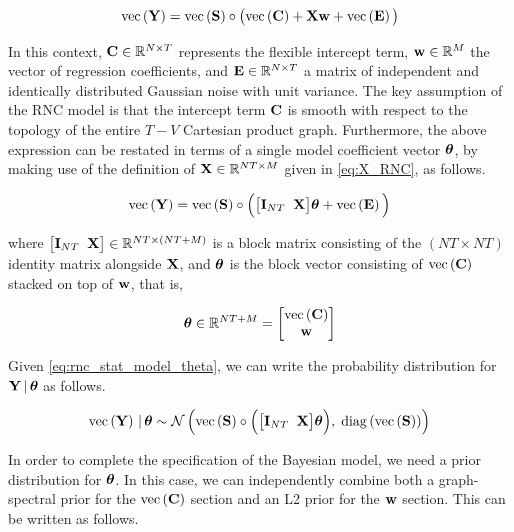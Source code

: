 \begin{equation}
    \label{eq:rnc_stat_model_wc}
    \text{\textup{vec}}\left(\mathbf{Y}\right) = \text{\textup{vec}}\left(\mathbf{S}\right) \circ \big( \text{\textup{vec}}\left(\mathbf{C}\right) + \mathbf{X} \mathbf{w}  + \text{\textup{vec}}\left(\mathbf{E}\right) \big)
\end{equation}

In this context, $\mathbf{C} \in \mathbb{R}^{N \times T}$ represents the flexible intercept term, $\mathbf{w} \in \mathbb{R}^{M}$ the vector of regression coefficients, and $\mathbf{E} \in \mathbb{R}^{N \times T}$ a matrix of independent and identically distributed Gaussian noise with unit variance. The key assumption of the RNC model is that the intercept term $\mathbf{C}$ is smooth with respect to the topology of the entire $T-V$ Cartesian product graph. Furthermore, the above expression can be restated in terms of a single model coefficient vector $\boldsymbol{\theta}$, by making use of the definition of $\mathbf{X} \in \mathbb{R}^{NT \times M}$ given in \cref{eq:X_RNC}, as follows.

\begin{equation}
    \label{eq:rnc_stat_model_theta}
    \text{\textup{vec}}\left(\mathbf{Y}\right) = \text{\textup{vec}}\left(\mathbf{S}\right) \circ \Big( \big[ \mathbf{I}_{NT} \;\; \mathbf{X} \big]\boldsymbol{\theta}  + \text{\textup{vec}}\left(\mathbf{E}\right) \Big)
\end{equation}

where $\big[ \mathbf{I}_{NT} \;\; \mathbf{X} \big] \in \mathbb{R}^{NT \times (NT + M)}$ is a block matrix consisting of the $(NT \times NT)$ identity matrix alongside $\mathbf{X}$, and $\boldsymbol{\theta}$ is the block vector consisting of $\text{\textup{vec}}\left(\mathbf{C}\right)$ stacked on top of $\mathbf{w}$, that is, 

\begin{equation}
    \boldsymbol{\theta} \in \mathbb{R}^{NT + M} = \begin{bmatrix} \text{\textup{vec}}\left(\mathbf{C}\right) \\ \mathbf{w} \end{bmatrix}
\end{equation}

Given \cref{eq:rnc_stat_model_theta}, we can write the probability distribution for $\mathbf{Y} \, | \, \boldsymbol{\theta}$ as follows.  

\begin{equation}
    \label{eq:Y_given_theta_rnc}
    \text{\textup{vec}}\left(\mathbf{Y}\right) \, | \, \boldsymbol{\theta} \sim \mathcal{N}\left(\text{\textup{vec}}\left(\mathbf{S}\right) \circ \Big( \big[ \mathbf{I}_{NT} \;\; \mathbf{X} \big]\boldsymbol{\theta} \Big), \; \text{\textup{diag}}\left(\text{\textup{vec}}\left(\mathbf{S}\right)\right)\right)
\end{equation}

In order to complete the specification of the Bayesian model, we need a prior distribution for $\boldsymbol{\theta}$. In this case, we can independently combine both a graph-spectral prior for the $\text{\textup{vec}}\left(\mathbf{C}\right)$ section and an L2 prior for the $\mathbf{w}$ section. This can be written as follows. 


